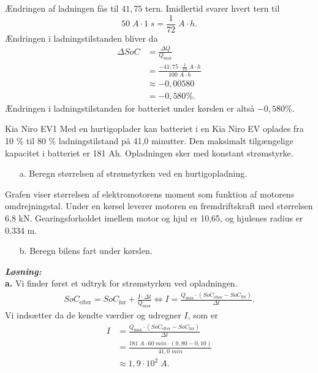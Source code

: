 \documentclass{report}
\newcommand{\sol}{\setlength{\parindent}{0cm}\textbf{\textit{Løsning:}}\setlength{\parindent}{1cm}}
\begin{document}
Ændringen af ladningen fås til $41,75$ tern.
Imidlertid svarer hvert tern til 
\[
50 \;\unit{A} \cdot 1 \;\unit{s} =\frac{1}{72} \;\unit{A \cdot h}.
\] 
Ændringen i ladningstilstanden bliver da
\begin{equation*}
\begin{split}
  \Delta SoC &= \frac{\Delta Q}{Q _{\text{max} }}\\
  &=\frac{-41,75 \cdot \frac{1}{72} \;\unit{A \cdot h} }{100 \;\unit{A \cdot h} }\\
  &\approx -0,00580\\
  &=-0,580 \%.
\end{split}
\end{equation*}
Ændringen i ladningstilstanden for batteriet under kørslen er altså $-0,580 \%$.

\begin{question}{Kia Niro EV1}{}
  Med en hurtigoplader kan batteriet i en Kia Niro EV oplades fra 10 \% til 80 \% ladningstilstand på 41,0 minutter.
Den maksimalt tilgængelige kapacitet i batteriet er 181 Ah.
Opladningen sker med konstant strømstyrke.
\begin{itemize}
  \item[a.] Beregn størrelsen af strømstyrken ved en hurtigopladning.
\end{itemize}
Grafen viser størrelsen af elektromotorens moment som funktion af motorens omdrejningstal.
Under en kørsel leverer motoren en fremdriftskraft med størrelsen 6,8 kN.
Gearingsforholdet imellem motor og hjul er 10,65, og hjulenes radius er 0,334 m.
\begin{itemize}
  \item[b.] Beregn bilens fart under kørslen.
\end{itemize}
\end{question}
\sol \\
\textbf{a.}
Vi finder først et udtryk for strømstyrken ved opladningen.
\begin{equation*}
\begin{split}
  SoC _{\text{efter} }=SoC _{\text{før} } + \frac{I \cdot \Delta t}{Q _{\text{max} }} \iff I=\frac{Q _{\text{max} } \cdot \left(SoC _{\text{efter} }- SoC _{\text{før} }\right) }{\Delta t}.
\end{split}
\end{equation*}
Vi indsætter da de kendte værdier og udregner $I$, som er
\begin{equation*}
\begin{split}
  I&=\frac{Q _{\text{max} } \cdot \left(SoC _{\text{efter} }- SoC _{\text{før} }\right) }{\Delta t} \\
  &=\frac{181 \;\unit{A} \cdot 60 \;\unit{min} \cdot \left(0,80-0,10\right) }{41,0 \;\unit{min}}\\
  &\approx 1,9 \cdot 10^2 \;\unit{A}.
\end{split}
\end{equation*}
\end{document}
